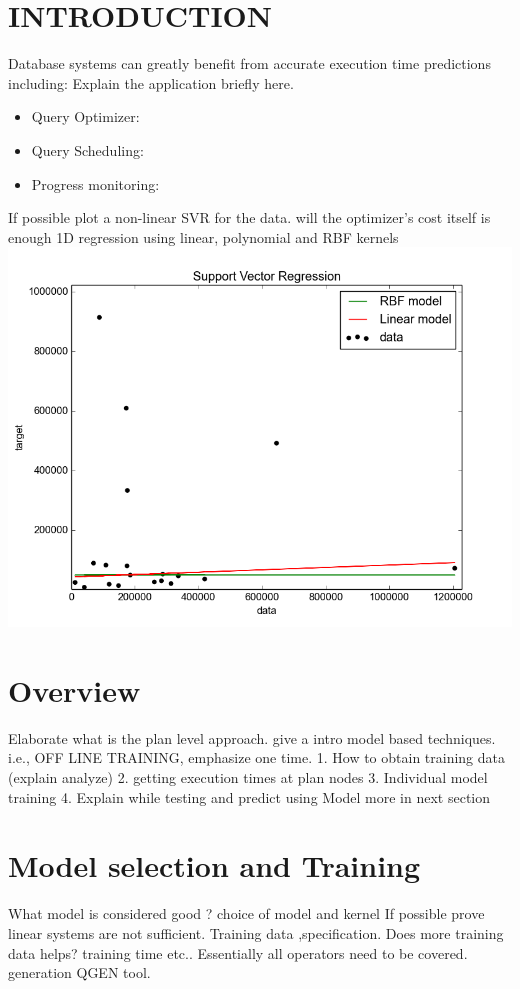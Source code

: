 \documentclass{article}
\begin{document}
	\begin{multicols}{2}
	\section{INTRODUCTION}
	Database systems can greatly benefit from accurate execution time predictions including: 
	Explain the application briefly here.
	\begin{itemize}
	\item Query Optimizer: 
	\item Query Scheduling:
	\item Progress monitoring:
	\end{itemize}
	If possible plot a non-linear SVR for the data. will the optimizer's cost 
	itself is enough 1D regression using linear, polynomial and RBF kernels
	\includegraphics[scale=.33]{optcost.png}  
	\section{Overview}
	Elaborate what is the plan level approach. give  a intro model
	 based techniques. i.e.,  OFF LINE TRAINING, emphasize one time.
	1. How to obtain training data (explain analyze)
	2. getting execution times at plan nodes
	3. Individual model training 
	4. Explain while testing and predict using Model more in next section
	\section{Model selection and Training}
	What model is considered good ? choice of model and kernel
	If possible prove linear systems are not sufficient.
	Training data ,specification. Does more training data helps?
	 training time etc.. 
	Essentially all operators need to be covered. generation QGEN tool. 

\end{multicols}
\end{document}
